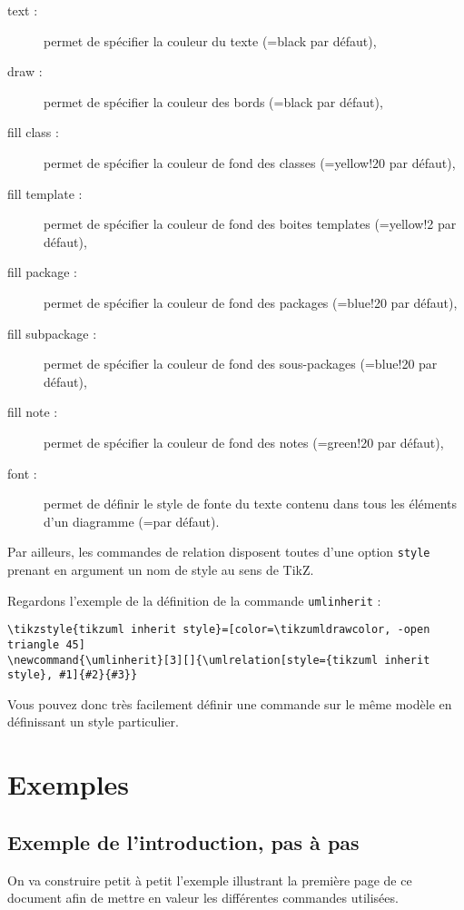 \documentclass[a4paper,11pt]{report}
\begin{document}
\begin{description}
\item[text : ] permet de spécifier la couleur du texte (=black par défaut),
\item[draw :] permet de spécifier la couleur des bords (=black par défaut),
\item[fill class :] permet de spécifier la couleur de fond des classes (=yellow!20 par défaut),
\item[fill template :] permet de spécifier la couleur de fond des boites templates (=yellow!2 par défaut),
\item[fill package :] permet de spécifier la couleur de fond des packages (=blue!20 par défaut),
\item[fill subpackage :] permet de spécifier la couleur de fond des sous-packages (=blue!20 par défaut),
\item[fill note :] permet de spécifier la couleur de fond des notes (=green!20 par défaut),
\item[font :] permet de définir le style de fonte du texte contenu dans tous les éléments d'un diagramme (=\small par défaut).
\end{description}

Par ailleurs, les commandes de relation disposent toutes d'une option {\tt style} prenant en argument un nom de style au sens de TikZ.

Regardons l'exemple de la définition de la commande {\tt umlinherit} :

\begin{lstlisting}
\tikzstyle{tikzuml inherit style}=[color=\tikzumldrawcolor, -open triangle 45]
\newcommand{\umlinherit}[3][]{\umlrelation[style={tikzuml inherit style}, #1]{#2}{#3}}
\end{lstlisting}

Vous pouvez donc très facilement définir une commande sur le même modèle en définissant un style particulier.

\section{Exemples}

\subsection{Exemple de l'introduction, pas à pas}

On va construire petit à petit l'exemple illustrant la première page de ce document afin de mettre en valeur les différentes commandes utilisées.
\end{document}
